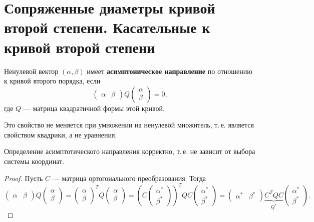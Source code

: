 \section{Сопряженные диаметры кривой второй степени. Касательные к кривой второй степени}

\begin{definition}
    Ненулевой вектор $(\alpha, \beta)$ имеет \textbf{асимптоническое направление} по отношению к кривой второго порядка, если
    $$
    \begin{pmatrix}
        \alpha & \beta
    \end{pmatrix}
    Q
    \begin{pmatrix}
        \alpha\\\beta
    \end{pmatrix} = 0,
    $$
    где $Q$ --- матрица квадратичной формы этой кривой.
\end{definition}

\begin{orangebox}
    Это свойство не меняется при умножении на ненулевой множитель, т.\,е. является свойством квадрики, а не уравнения.
\end{orangebox}

\begin{statement}
    Определение асимптотического направления корректно, т.\,е. не зависит от выбора системы координат.
\end{statement}

\begin{proof}
    Пусть $C$ --- матрица ортогонального преобразования. Тогда
    $$
    \begin{pmatrix}
        \alpha & \beta
    \end{pmatrix}
    Q
    \begin{pmatrix}
        \alpha\\\beta
    \end{pmatrix} = 
    \begin{pmatrix}
        \alpha\\\beta
    \end{pmatrix}^TQ
    \begin{pmatrix}
        \alpha\\\beta
    \end{pmatrix} = 
    \left(
        C\begin{pmatrix}
            \alpha^\ast\\\beta^\ast
        \end{pmatrix}
    \right)^TQC
    \begin{pmatrix}
        \alpha^\ast\\\beta^\ast
    \end{pmatrix} = 
    \begin{pmatrix}
        \alpha^\ast & \beta^\ast
    \end{pmatrix}\underbrace{C^TQC}_{Q^\ast}
    \begin{pmatrix}
        \alpha^\ast\\\beta^\ast
    \end{pmatrix}.
    $$
\end{proof}

